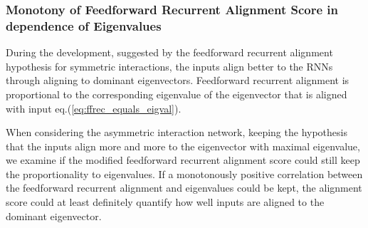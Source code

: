 \documentclass[11pt]{article}
\begin{document}
	\subsubsection{Monotony of Feedforward Recurrent Alignment Score in dependence of Eigenvalues}
	
	During the development, suggested by the feedforward recurrent alignment hypothesis for symmetric interactions, the inputs align better to the RNNs through aligning to dominant eigenvectors. Feedforward recurrent alignment is proportional to the corresponding eigenvalue of the eigenvector that is aligned with input eq.(\ref{eq:ffrec_equals_eigval}). 
	
	When considering the asymmetric interaction network, keeping the hypothesis that the inputs align more and more to the eigenvector with maximal eigenvalue, we examine if the modified feedforward recurrent alignment score could still keep the proportionality to eigenvalues. 
	If a monotonously positive correlation between the feedforward recurrent alignment and eigenvalues could be kept, the alignment score could at least definitely quantify how well inputs are aligned to the dominant eigenvector. 
	
\end{document}
